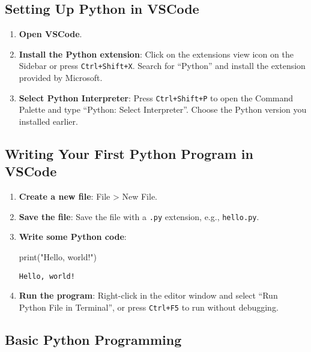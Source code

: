 \documentclass[
  letterpaper,
  DIV=11,
  numbers=noendperiod]{scrreprt}
\newenvironment{Shaded}{\begin{snugshade}}{\end{snugshade}}
\newcommand{\BuiltInTok}[1]{\textcolor[rgb]{0.00,0.23,0.31}{#1}}
\newcommand{\NormalTok}[1]{\textcolor[rgb]{0.00,0.23,0.31}{#1}}
\newcommand{\StringTok}[1]{\textcolor[rgb]{0.13,0.47,0.30}{#1}}
\providecommand{\tightlist}{%
  \setlength{\itemsep}{0pt}\setlength{\parskip}{0pt}}\usepackage{longtable,booktabs,array}
\begin{document}
\subsection{Setting Up Python in
VSCode}\label{setting-up-python-in-vscode}

\begin{enumerate}
\def\labelenumi{\arabic{enumi}.}
\tightlist
\item
  \textbf{Open VSCode}.
\item
  \textbf{Install the Python extension}: Click on the extensions view
  icon on the Sidebar or press \texttt{Ctrl+Shift+X}. Search for
  ``Python'' and install the extension provided by Microsoft.
\item
  \textbf{Select Python Interpreter}: Press \texttt{Ctrl+Shift+P} to
  open the Command Palette and type ``Python: Select Interpreter''.
  Choose the Python version you installed earlier.
\end{enumerate}

\subsection{Writing Your First Python Program in
VSCode}\label{writing-your-first-python-program-in-vscode}

\begin{enumerate}
\def\labelenumi{\arabic{enumi}.}
\item
  \textbf{Create a new file}: File \textgreater{} New File.
\item
  \textbf{Save the file}: Save the file with a \texttt{.py} extension,
  e.g., \texttt{hello.py}.
\item
  \textbf{Write some Python code}:

\begin{Shaded}
\begin{Highlighting}[]
\BuiltInTok{print}\NormalTok{(}\StringTok{"Hello, world!"}\NormalTok{)}
\end{Highlighting}
\end{Shaded}

\begin{verbatim}
Hello, world!
\end{verbatim}
\item
  \textbf{Run the program}: Right-click in the editor window and select
  ``Run Python File in Terminal'', or press \texttt{Ctrl+F5} to run
  without debugging.
\end{enumerate}

\subsection{Basic Python Programming}\label{basic-python-programming}
\end{document}

